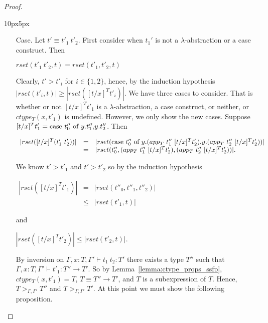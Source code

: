 \begin{proof}
\begin{changemargin}{10px}{5px}
\begin{itemize}
\item[Case.] Let $t' \equiv t'_1\ t'_2$.  First consider when $t_1'$ is not a $\lambda$-abstraction or a case construct. Then
  \begin{center}
    $rset(t'_1\ t'_2, t) = rset(t'_1, t'_2, t)$
  \end{center}  
  Clearly,  $t' > t'_i$ for $i \in \{1,2\}$, hence, by the induction hypothesis $|rset(t'_i,t)| \geq |rset([t/x]^T t'_i)|$.  
  We have three cases to consider.  That is whether or not $[t/x]^T t'_1$ is a $\lambda$-abstraction, 
  a case construct, or neither, or $ctype_T(x,t'_1)$ is undefined. However, we only show the new cases. 
  Suppose $[t/x]^T t'_1 = \mbox{case}\ t''_0\ \text{of}\ y\text{.}t''_1\text{,}y\text{.}t''_2$. Then 
  \begin{center}
    \small
    \begin{math}
      \begin{array}{lll}
        |rset([t/x]^T (t'_1\ t'_2))| & = & |rset(\ccon{t''_0}{y}{(app_T\ t''_1\ [t/x]^T t'_2)}{(app_T\ t''_2\ [t/x]^T t'_2)})|\\
        & = & |rset(t''_0, (app_T\ t''_1\ [t/x]^T t'_2), (app_T\ t''_2\ [t/x]^T t'_2))|.
      \end{array}
    \end{math}
  \end{center}
  We know $t' > t'_1$ and $t' > t'_2$ so by the induction hypothesis
  \begin{center}
    \begin{math}
      \begin{array}{lll}
        |rset([t/x]^T t'_1)| & =    & |rset(t''_0, t''_1,t''_2)|\\
        & \leq & |rset(t'_1,t)|
      \end{array}
    \end{math}
  \end{center}
  and
  \begin{center}
    \begin{math}
      |rset([t/x]^T t'_2)| \leq |rset(t'_2,t)|.
    \end{math}
  \end{center}
  By inversion on $\Gamma,x:T,\Gamma' \vdash t_1\ t_2:T'$ there exists a type $T''$ such that
  $\Gamma,x:T,\Gamma' \vdash t'_1:T'' \to T'$.  So by Lemma~\ref{lemma:ctype_props_ssfp},
  $ctype_T(x,t'_1) = T$, $T \equiv T'' \to T'$, and $T$ is a subexpression of $T$.  Hence,
  $T >_{\Gamma,\Gamma'} T''$ and $T >_{\Gamma,\Gamma'} T'$.  At this point we must show the following
  proposition.
  

\end{itemize}
\end{changemargin}
\end{proof}

